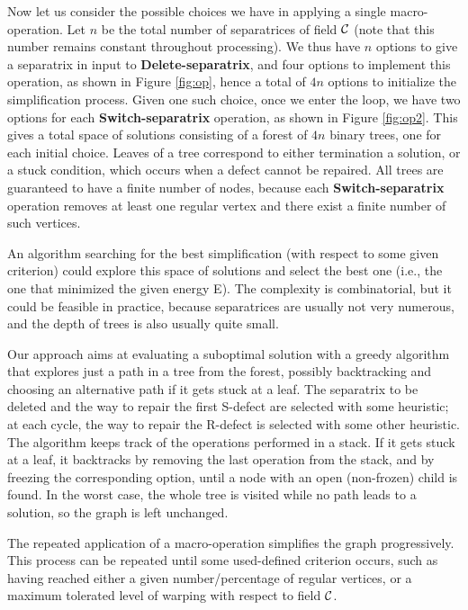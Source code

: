 \documentclass[11pt,a4paper]{article}
\begin{document}
Now let us consider the possible choices we have in applying a single macro-operation. 
Let $n$ be the total number of separatrices of field $\cal C$ (note that this number remains constant throughout processing).
We thus have $n$ options to give a separatrix in input to \textbf{Delete-separatrix}, and four options to implement this operation, as shown in Figure \ref{fig:op}, hence a total of $4n$ options to initialize the simplification process.   
Given one such choice, once we enter the loop, we have two options for each \textbf{Switch-separatrix} operation, as shown in Figure \ref{fig:op2}.
This gives a total space of solutions consisting of a forest of $4n$ binary trees, one for each initial choice.
Leaves of a tree correspond to either termination a solution, or a stuck condition, which occurs when a defect cannot be repaired.
All trees are guaranteed to have a finite number of nodes, because each \textbf{Switch-separatrix} operation removes at least one regular vertex and there exist a finite number of such vertices.

An algorithm searching for the best simplification (with respect to some given criterion) could explore this space of solutions and select the best one (i.e., the one that minimized the given energy {\cal E}).
The complexity is combinatorial, but it could be feasible in practice, because separatrices are usually not very numerous, and the depth of trees is also usually quite small.

Our approach aims at evaluating a suboptimal solution with a greedy algorithm that explores just a path in a tree from the forest, possibly backtracking and choosing an alternative path if it gets stuck at a leaf. 
The separatrix to be deleted and the way to repair the first S-defect are selected with some heuristic; at each cycle, the way to repair the R-defect is selected with some other heuristic. 
The algorithm keeps track of the operations performed in a stack. 
If it gets stuck at a leaf, it backtracks by removing the last operation from the stack, and by freezing the corresponding option, until a node with an open (non-frozen) child is found.
In the worst case, the whole tree is visited while no path leads to a solution, so the graph is left unchanged.

The repeated application of a macro-operation simplifies the graph progressively. 
This process can be repeated until some used-defined criterion occurs, such as having reached either a given number/percentage of regular vertices, or a maximum tolerated level of warping with respect to field $\cal C$.
\end{document}
